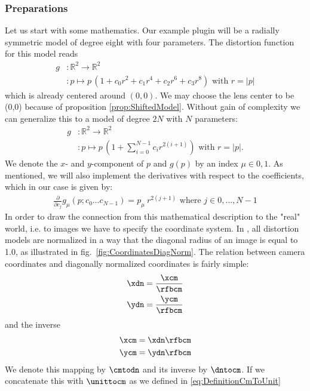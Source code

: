 \documentclass[10pt,a4paper]{article}
\newcommand{\Rpow}[1]{\mathbb{R}^{#1}}
\newcommand{\norm}[1]{\left|#1\right|}
\begin{document}
\subsubsection{Preparations}
Let us start with some mathematics. Our example plugin will be a radially symmetric model
of degree eight with four parameters. The distortion function for this model reads
\begin{align}
g &: \Rpow{2}\rightarrow\Rpow{2} \nonumber\\
  &: p \mapsto p\, (1 + c_0 r^2 + c_1 r^4 + c_2 r^6 + c_3 r^8)\text{\ with\ } r = \norm{p}
\label{eq:ExampleDistortionModel}
\end{align}
which is already centered around $(0,0)$.
We may choose the lens center to be (0,0) because of proposition \ref{prop:ShiftedModel}.
Without gain of complexity we can generalize this
to a model of degree $2N$ with $N$ parameters:
\begin{align}
g &: \Rpow{2}\rightarrow\Rpow{2} \nonumber\\
  &: p \mapsto p\, \left(1 + \sum_{i = 0}^{N - 1} c_i r^{2 (i + 1)}\right)\text{\ with\ } r = \norm{p}.
\label{eq:RadialDistortionDegN}
\end{align}
We denote the $x$- and $y$-component of $p$ and $g(p)$ by an index $\mu\in{0,1}$.
As mentioned, we will also implement the derivatives with respect to the coefficients,
which in our case is given by:
\begin{align}
\frac \partial {\partial c_j} g_\mu(p;c_0\ldots c_{N-1}) = p_\mu\ r^{2(j + 1)} \text{\ where\ } j\in{0,\ldots,N-1}
\end{align}
In order to draw the connection from this mathematical description to the "real" world, i.e. to images we have
to specify the coordinate system. In \tde, all distortion models are normalized
in a way that the diagonal radius of an image is equal to 1.0, as illustrated in fig.~\ref{fig:CoordinatesDiagNorm}.
The relation between camera coordinates and diagonally normalized coordinates is fairly simple:
\begin{align}
\label{eq:DefinitionCmToDn}
\xdn &= \frac \xcm \rfbcm \nonumber\\
\ydn &= \frac \ycm \rfbcm
\end{align}
and the inverse
\begin{align}
\label{eq:DefinitionDnToCm}
\xcm &= \xdn \rfbcm \nonumber\\
\ycm &= \ydn \rfbcm
\end{align}
We denote this mapping by $\cmtodn$ and its inverse by $\dntocm$. If we concatenate this with $\unittocm$ as we defined in \eqref{eq:DefinitionCmToUnit}
\end{document}
